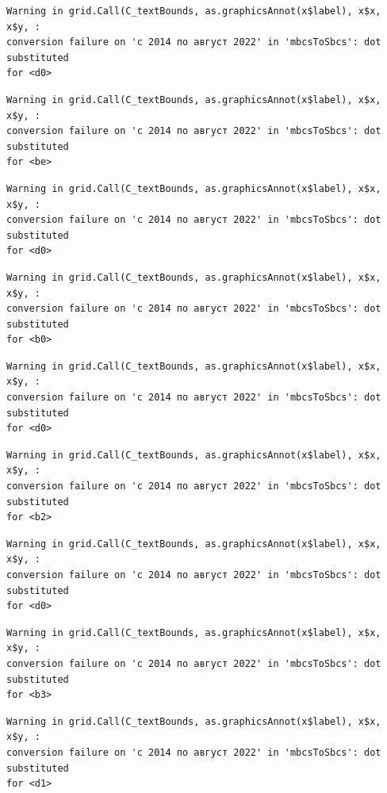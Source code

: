 \documentclass[
  letterpaper,
  DIV=11,
  numbers=noendperiod]{scrartcl}
\begin{document}
\begin{verbatim}
Warning in grid.Call(C_textBounds, as.graphicsAnnot(x$label), x$x, x$y, :
conversion failure on 'с 2014 по август 2022' in 'mbcsToSbcs': dot substituted
for <d0>
\end{verbatim}

\begin{verbatim}
Warning in grid.Call(C_textBounds, as.graphicsAnnot(x$label), x$x, x$y, :
conversion failure on 'с 2014 по август 2022' in 'mbcsToSbcs': dot substituted
for <be>
\end{verbatim}

\begin{verbatim}
Warning in grid.Call(C_textBounds, as.graphicsAnnot(x$label), x$x, x$y, :
conversion failure on 'с 2014 по август 2022' in 'mbcsToSbcs': dot substituted
for <d0>
\end{verbatim}

\begin{verbatim}
Warning in grid.Call(C_textBounds, as.graphicsAnnot(x$label), x$x, x$y, :
conversion failure on 'с 2014 по август 2022' in 'mbcsToSbcs': dot substituted
for <b0>
\end{verbatim}

\begin{verbatim}
Warning in grid.Call(C_textBounds, as.graphicsAnnot(x$label), x$x, x$y, :
conversion failure on 'с 2014 по август 2022' in 'mbcsToSbcs': dot substituted
for <d0>
\end{verbatim}

\begin{verbatim}
Warning in grid.Call(C_textBounds, as.graphicsAnnot(x$label), x$x, x$y, :
conversion failure on 'с 2014 по август 2022' in 'mbcsToSbcs': dot substituted
for <b2>
\end{verbatim}

\begin{verbatim}
Warning in grid.Call(C_textBounds, as.graphicsAnnot(x$label), x$x, x$y, :
conversion failure on 'с 2014 по август 2022' in 'mbcsToSbcs': dot substituted
for <d0>
\end{verbatim}

\begin{verbatim}
Warning in grid.Call(C_textBounds, as.graphicsAnnot(x$label), x$x, x$y, :
conversion failure on 'с 2014 по август 2022' in 'mbcsToSbcs': dot substituted
for <b3>
\end{verbatim}

\begin{verbatim}
Warning in grid.Call(C_textBounds, as.graphicsAnnot(x$label), x$x, x$y, :
conversion failure on 'с 2014 по август 2022' in 'mbcsToSbcs': dot substituted
for <d1>
\end{verbatim}
\end{document}
